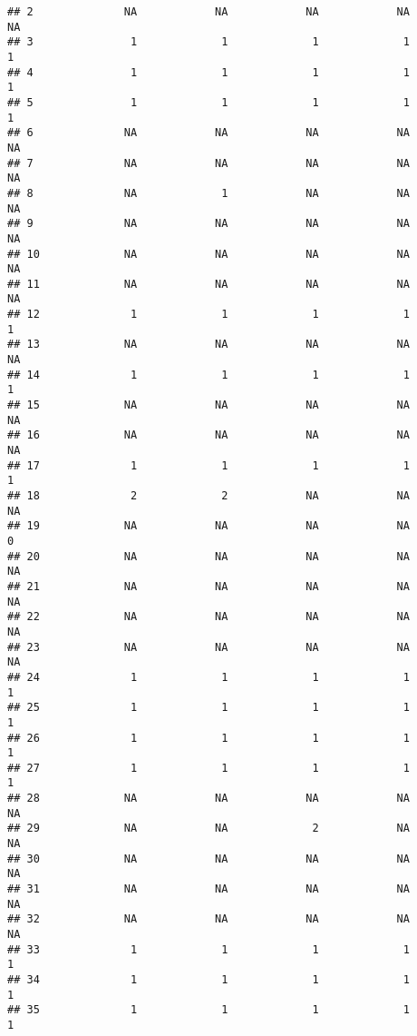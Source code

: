 \documentclass[
]{article}
\begin{document}
\begin{verbatim}
## 2              NA            NA            NA            NA            NA
## 3               1             1             1             1             1
## 4               1             1             1             1             1
## 5               1             1             1             1             1
## 6              NA            NA            NA            NA            NA
## 7              NA            NA            NA            NA            NA
## 8              NA             1            NA            NA            NA
## 9              NA            NA            NA            NA            NA
## 10             NA            NA            NA            NA            NA
## 11             NA            NA            NA            NA            NA
## 12              1             1             1             1             1
## 13             NA            NA            NA            NA            NA
## 14              1             1             1             1             1
## 15             NA            NA            NA            NA            NA
## 16             NA            NA            NA            NA            NA
## 17              1             1             1             1             1
## 18              2             2            NA            NA            NA
## 19             NA            NA            NA            NA             0
## 20             NA            NA            NA            NA            NA
## 21             NA            NA            NA            NA            NA
## 22             NA            NA            NA            NA            NA
## 23             NA            NA            NA            NA            NA
## 24              1             1             1             1             1
## 25              1             1             1             1             1
## 26              1             1             1             1             1
## 27              1             1             1             1             1
## 28             NA            NA            NA            NA            NA
## 29             NA            NA             2            NA            NA
## 30             NA            NA            NA            NA            NA
## 31             NA            NA            NA            NA            NA
## 32             NA            NA            NA            NA            NA
## 33              1             1             1             1             1
## 34              1             1             1             1             1
## 35              1             1             1             1             1

\end{verbatim}
\end{document}
